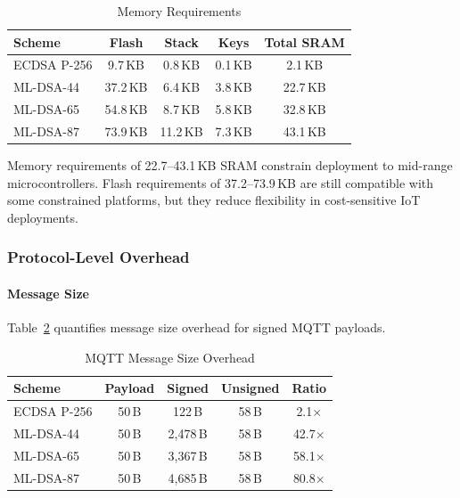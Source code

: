 \documentclass[final, twoside]{IEEEtran} %
\begin{document}
\begin{table}[h]
	\centering
	\caption{Memory Requirements}
	\label{tab:memory}
	\begin{tabular}{lcccc}
		\toprule
		\textbf{Scheme} & \textbf{Flash} & \textbf{Stack} & \textbf{Keys} & \textbf{Total SRAM} \\
		\midrule
		ECDSA P-256     & 9.7\,KB        & 0.8\,KB        & 0.1\,KB       & 2.1\,KB             \\
		ML-DSA-44       & 37.2\,KB       & 6.4\,KB        & 3.8\,KB       & 22.7\,KB            \\
		ML-DSA-65       & 54.8\,KB       & 8.7\,KB        & 5.8\,KB       & 32.8\,KB            \\
		ML-DSA-87       & 73.9\,KB       & 11.2\,KB       & 7.3\,KB       & 43.1\,KB            \\
		\bottomrule
	\end{tabular}
\end{table}

Memory requirements of 22.7--43.1\,KB SRAM constrain deployment to mid-range microcontrollers. Flash requirements of 37.2--73.9\,KB are still compatible with some constrained platforms, but they reduce flexibility in cost-sensitive IoT deployments.

\subsubsection{Protocol-Level Overhead}

\paragraph{Message Size}

Table~\ref{tab:message-overhead} quantifies message size overhead for signed MQTT payloads.

\begin{table}[h]
	\centering
	\caption{MQTT Message Size Overhead}
	\label{tab:message-overhead}
	\begin{tabular}{lcccc}
		\toprule
		\textbf{Scheme} & \textbf{Payload} & \textbf{Signed} & \textbf{Unsigned} & \textbf{Ratio} \\
		\midrule
		ECDSA P-256     & 50\,B            & 122\,B          & 58\,B             & 2.1$\times$    \\
		ML-DSA-44       & 50\,B            & 2,478\,B        & 58\,B             & 42.7$\times$   \\
		ML-DSA-65       & 50\,B            & 3,367\,B        & 58\,B             & 58.1$\times$   \\
		ML-DSA-87       & 50\,B            & 4,685\,B        & 58\,B             & 80.8$\times$   \\
		\bottomrule
	\end{tabular}
\end{table}
\end{document}
